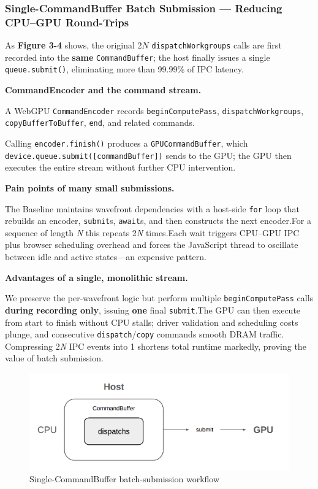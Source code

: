 \documentclass[PhD]{PHlab-thesis}
\begin{document}
\subsubsection{Single-CommandBuffer Batch Submission — Reducing CPU–GPU Round-Trips}
As \textbf{Figure 3-4} shows, the original 2$N$ \texttt{dispatchWorkgroups} calls are first recorded into the \textbf{same} \texttt{CommandBuffer}; the host finally issues a single \texttt{queue.submit()}, eliminating more than 99.99\% of IPC latency.

\textbf{CommandEncoder and the command stream.}

A WebGPU \texttt{CommandEncoder} records \texttt{beginComputePass}, \texttt{dispatchWorkgroups}, \texttt{copyBufferToBuffer}, \texttt{end}, and related commands.

Calling \texttt{encoder.finish()} produces a \texttt{GPUCommandBuffer}, which \texttt{device.queue.submit([commandBuffer])} sends to the GPU; the GPU then executes the entire stream without further CPU intervention.

\textbf{Pain points of many small submissions.}

The Baseline maintains wavefront dependencies with a host-side \texttt{for} loop that rebuilds an encoder, \texttt{submit}s, \texttt{await}s, and then constructs the next encoder.For a sequence of length \emph{N} this repeats 2\emph{N} times.Each wait triggers CPU–GPU IPC plus browser scheduling overhead and forces the JavaScript thread to oscillate between idle and active states—an expensive pattern.

\textbf{Advantages of a single, monolithic stream.}

We preserve the per-wavefront logic but perform multiple \texttt{beginComputePass} calls \textbf{during recording only}, issuing \textbf{one} final \texttt{submit}.The GPU can then execute from start to finish without CPU stalls; driver validation and scheduling costs plunge, and consecutive \texttt{dispatch}/\texttt{copy} commands smooth DRAM traffic.
Compressing 2\emph{N} IPC events into 1 shortens total runtime markedly, proving the value of batch submission.

\begin{figure}[htbp]
    \centering
    \includegraphics[width=0.7\linewidth]{1. 單一 CommandBuffer 示意圖.png}
    \caption{Single-CommandBuffer batch-submission workflow}
    \label{fig:scb-batch-workflow}
\end{figure}
\end{document}

